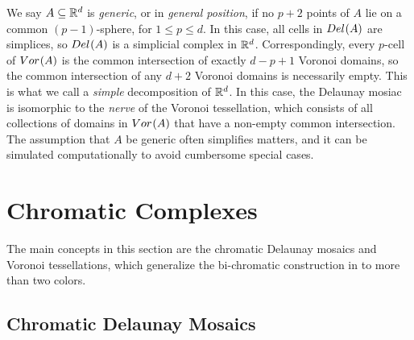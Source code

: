 \documentclass[a4paper]{article}
\newcommand {\mm}[1]   {\ifmmode{#1}\else{\mbox{\(#1\)}}\fi}
\newcommand{\Rspace}        {\mm{{\mathbb R}}}
\newcommand{\Voronoi}[2]    {\mm{{\rm Vor}_{#1}{({#2})}}}
\newcommand{\Delaunay}[2]   {\mm{{\rm Del}_{#1}{({#2})}}}
\theoremstyle{definition}
\numberwithin{theorem}{section}
\numberwithin{equation}{section}
\begin{document}
\medskip
We say $A \subseteq \Rspace^d$ is \emph{generic}, or in \emph{general position}, if no $p+2$ points of $A$ lie on a common $(p-1)$-sphere, for $1 \leq p \leq d$.
In this case, all cells in $\Delaunay{}{A}$ are simplices, so $\Delaunay{}{A}$ is a simplicial complex in $\Rspace^d$.
Correspondingly, every $p$-cell of $\Voronoi{}{A}$ is the common intersection of exactly $d-p+1$ Voronoi domains, so the common intersection of any $d+2$ Voronoi domains is necessarily empty.
This is what we call a \emph{simple} decomposition of $\Rspace^d$.
In this case, the Delaunay mosiac is isomorphic to the \emph{nerve} of the Voronoi tessellation, which consists of all collections of domains in $\Voronoi{}{A}$ that have a non-empty common intersection.
The assumption that $A$ be generic often simplifies matters, and it can be simulated computationally \cite{EdMu90} to avoid cumbersome special cases.

\section{Chromatic Complexes}
\label{sec:3}

The main concepts in this section are the
chromatic Delaunay mosaics and Voronoi tessellations, which generalize the bi-chromatic construction in \cite{ReBo21} to more than two colors.

\subsection{Chromatic Delaunay Mosaics}
\label{sec:3.1}
\end{document}
